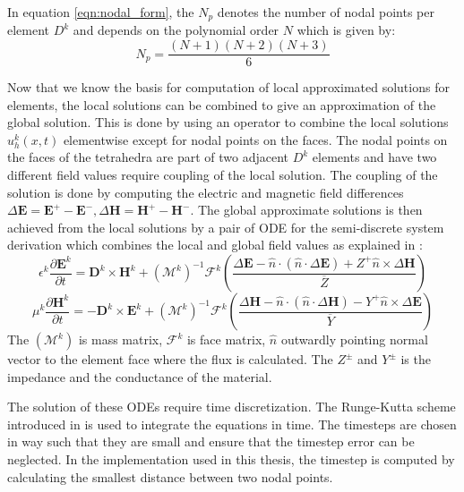 In equation \ref{eqn:nodal_form}, the $ N_p $ denotes the number of nodal points per element $ D^k $
and depends on the polynomial order $ N $ which is given by:
\begin{equation}\label{eqn:nprelation}
    N_p = \frac{(N+1)(N+2)(N+3)}{6}
\end{equation}

Now that we know the basis for computation of local approximated solutions for elements,
the local solutions can be combined to give an approximation of the global solution. This is
done by using an operator to combine the local solutions $ u_h^k(x,t) $ elementwise
except for nodal points on the faces. The nodal points
on the faces of the tetrahedra are part of two adjacent $ D^k $ elements and have two different
field values require coupling of the local solution. The coupling of the solution is done
by computing the electric and magnetic field differences \cite{kenter_opencl-based_2018} $\Delta \textbf{E}
= \textbf{E}^+-\textbf{E}^-, \Delta \textbf{H} = \textbf{H}^+ - \textbf{H}^-$.
The global approximate solutions is then achieved from the local solutions \cite{kenter_opencl-based_2018, busch_discontinuous_2011}
by a pair of \ac{ODE} for the semi-discrete system derivation which combines the local and global
field values as explained in \cite{hesthaven_nodal_2008}:
\begin{equation}\label{eqn:pde_e}
\epsilon^k \frac{\partial \textbf{E}^k}{\partial t} = \textbf{D}^k \times \textbf{H}^k
+ (\mathcal{M}^k)^{-1}\mathcal{F}^k \left( \frac{\Delta\textbf{E}-\hat{n} \cdot (\hat{n} \cdot \Delta \textbf{E})+Z^+ \hat{n} \times \Delta \textbf{H} }{\overline{Z}} \right)
\end{equation}
\begin{equation}\label{eqn:pde_h}
    \mu^k \frac{\partial \textbf{H}^k}{\partial t} = - \textbf{D}^k \times \textbf{E}^k
    + (\mathcal{M}^k)^{-1} \mathcal{F}^k \left ( \frac{\Delta \textbf{H} -\hat{n} \cdot (\hat{n} \cdot \Delta \textbf{H})-Y^+ \hat{n} \times \Delta \textbf{E}}{\overline{Y}} \right)
\end{equation}
The $ (\mathcal{M}^k) $ is mass matrix, $\mathcal{F}^k$ is face matrix, $\hat{n}$ outwardly
pointing normal vector to the element face where the flux is calculated. The $ Z^\pm $ and $Y^\pm$ is the impedance and the conductance of the material.

The solution of these \ac{ODE}s require time discretization. The Runge-Kutta
scheme introduced in \cite{shu_total-variation-diminishing_1988} is used
\cite{hesthaven_nodal_2008, kenter_opencl-based_2018} to integrate the
equations in time. The timesteps are chosen in way such that they are small
and ensure that the timestep error can be neglected. In the implementation used
in this thesis, the timestep is computed by calculating the smallest distance between two nodal points.

